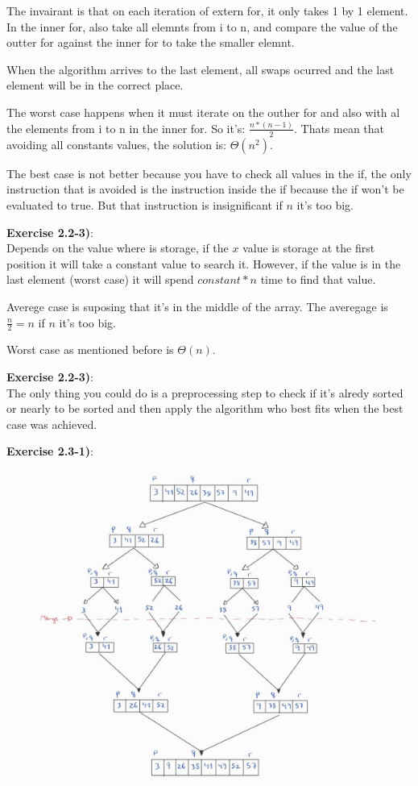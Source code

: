 \documentclass{article}
\newcounter{exercise}[section]   %
\begin{document}
The invairant is that on each iteration of extern for, it only takes 1 by 1 element. In the
inner for, also take all elemnts from i to n, and compare the value of the outter for
against the inner for to take the smaller elemnt.

When the algorithm arrives to the last element, all swaps ocurred and the last element will
be in the correct place.

The worst case happens when it must iterate on the outher for and also with al the elements
from i to n in the inner for. So it's: \(\frac{n*(n - 1)}{2}\). Thats mean that avoiding all
constants values, the solution is: \(\Theta(n^2)\).

The best case is not better because you have to check all values in the if, the only instruction
that is avoided is the instruction inside the if because the if won't be evaluated to true.
But that instruction is insignificant if \(n\) it's too big.

\textbf{Exercise 2.2-3)}:\\
Depends on the value where is storage, if the \(x\) value is storage at the first position it
will take a constant value to search it. However, if the value is in the last element 
(worst case) it will spend \(constant * n\) time to find that value.

Averege case is suposing that it's in the middle of the array. The averegage is \(\frac{n}{2} = n\)
if \(n\) it's too big. 

Worst case as mentioned before is \(\Theta(n)\).

\textbf{Exercise 2.2-3)}:\\
The only thing you could do is a preprocessing step to check if it's alredy sorted or nearly
to be sorted and then apply the algorithm who best fits when the best case was achieved.

\textbf{Exercise 2.3-1)}:\\
\begin{figure}[h]
    \includegraphics[scale=0.4]{Problem2_3_1.jpeg}
    \centering
\end{figure}
\newpage
\end{document}
